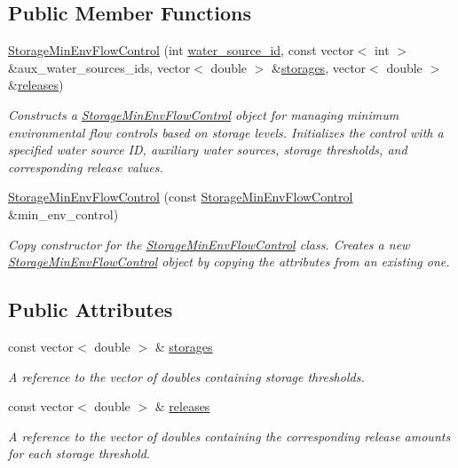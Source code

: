 \subsection*{Public Member Functions}
\begin{DoxyCompactItemize}
\item 
\mbox{\hyperlink{classStorageMinEnvFlowControl_aba965c28890bf5abb1230dd6d8879f18}{Storage\+Min\+Env\+Flow\+Control}} (int \mbox{\hyperlink{classMinEnvFlowControl_aada518a047598f386daec1d0358023aa}{water\+\_\+source\+\_\+id}}, const vector$<$ int $>$ \&aux\+\_\+water\+\_\+sources\+\_\+ids, vector$<$ double $>$ \&\mbox{\hyperlink{classStorageMinEnvFlowControl_af68170e5f561f1bfc2062f9e6ec8dd6d}{storages}}, vector$<$ double $>$ \&\mbox{\hyperlink{classStorageMinEnvFlowControl_af187563525a0b5b437d27134bff34646}{releases}})
\begin{DoxyCompactList}\small\item\em Constructs a {\ttfamily \mbox{\hyperlink{classStorageMinEnvFlowControl}{Storage\+Min\+Env\+Flow\+Control}}} object for managing minimum environmental flow controls based on storage levels. Initializes the control with a specified water source ID, auxiliary water sources, storage thresholds, and corresponding release values. \end{DoxyCompactList}\item 
\mbox{\hyperlink{classStorageMinEnvFlowControl_a2279f6d44b8ba69830a29654ddee8d3a}{Storage\+Min\+Env\+Flow\+Control}} (const \mbox{\hyperlink{classStorageMinEnvFlowControl}{Storage\+Min\+Env\+Flow\+Control}} \&min\+\_\+env\+\_\+control)
\begin{DoxyCompactList}\small\item\em Copy constructor for the {\ttfamily \mbox{\hyperlink{classStorageMinEnvFlowControl}{Storage\+Min\+Env\+Flow\+Control}}} class. Creates a new {\ttfamily \mbox{\hyperlink{classStorageMinEnvFlowControl}{Storage\+Min\+Env\+Flow\+Control}}} object by copying the attributes from an existing one. \end{DoxyCompactList}\end{DoxyCompactItemize}
\subsection*{Public Attributes}
\begin{DoxyCompactItemize}
\item 
const vector$<$ double $>$ \& \mbox{\hyperlink{classStorageMinEnvFlowControl_af68170e5f561f1bfc2062f9e6ec8dd6d}{storages}}
\begin{DoxyCompactList}\small\item\em A reference to the vector of doubles containing storage thresholds. \end{DoxyCompactList}\item 
const vector$<$ double $>$ \& \mbox{\hyperlink{classStorageMinEnvFlowControl_af187563525a0b5b437d27134bff34646}{releases}}
\begin{DoxyCompactList}\small\item\em A reference to the vector of doubles containing the corresponding release amounts for each storage threshold. \end{DoxyCompactList}\end{DoxyCompactItemize}

